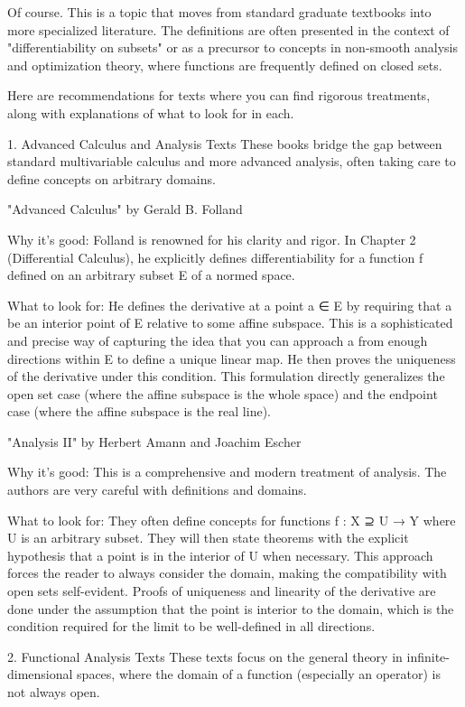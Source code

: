 \documentclass{book}
\begin{document}
Of course. This is a topic that moves from standard graduate textbooks into more specialized literature. The definitions are often presented in the context of "differentiability on subsets" or as a precursor to concepts in non-smooth analysis and optimization theory, where functions are frequently defined on closed sets.

Here are recommendations for texts where you can find rigorous treatments, along with explanations of what to look for in each.

1. Advanced Calculus and Analysis Texts
These books bridge the gap between standard multivariable calculus and more advanced analysis, often taking care to define concepts on arbitrary domains.

"Advanced Calculus" by Gerald B. Folland

Why it's good: Folland is renowned for his clarity and rigor. In Chapter 2 (Differential Calculus), he explicitly defines differentiability for a function f defined on an arbitrary subset E of a normed space.

What to look for: He defines the derivative at a point a ∈ E by requiring that a be an interior point of E relative to some affine subspace. This is a sophisticated and precise way of capturing the idea that you can approach a from enough directions within E to define a unique linear map. He then proves the uniqueness of the derivative under this condition. This formulation directly generalizes the open set case (where the affine subspace is the whole space) and the endpoint case (where the affine subspace is the real line).

"Analysis II" by Herbert Amann and Joachim Escher

Why it's good: This is a comprehensive and modern treatment of analysis. The authors are very careful with definitions and domains.

What to look for: They often define concepts for functions f : X ⊇ U → Y where U is an arbitrary subset. They will then state theorems with the explicit hypothesis that a point is in the interior of U when necessary. This approach forces the reader to always consider the domain, making the compatibility with open sets self-evident. Proofs of uniqueness and linearity of the derivative are done under the assumption that the point is interior to the domain, which is the condition required for the limit to be well-defined in all directions.

2. Functional Analysis Texts
These texts focus on the general theory in infinite-dimensional spaces, where the domain of a function (especially an operator) is not always open.
\end{document}
